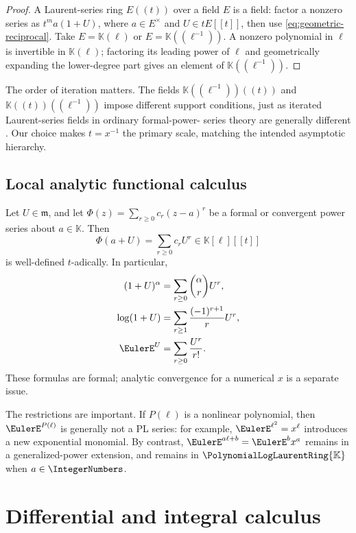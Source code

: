 \documentclass[11pt,oneside]{article}
\numberwithin{equation}{section}
\theoremstyle{definition}
\newcommand{\K}{\mathbb{K}}
\newcommand{\PL}{\PolynomialLogLaurentRing{\K}}
\begin{document}
\begin{proof}
A Laurent-series ring \(E((t))\) over a field \(E\) is a field: factor a nonzero
series as \(t^m a(1+U)\), where \(a\in E^\times\) and \(U\in tE[[t]]\), then use
\eqref{eq:geometric-reciprocal}.  Take \(E=\K(\ell)\) or
\(E=\K((\ell^{-1}))\).  A nonzero polynomial in \(\ell\) is invertible in
\(\K(\ell)\); factoring its leading power of \(\ell\) and geometrically expanding
the lower-degree part gives an element of \(\K((\ell^{-1}))\).
\end{proof}

The order of iteration matters.  The fields
\(\K((\ell^{-1}))((t))\) and \(\K((t))((\ell^{-1}))\) impose different support
conditions, just as iterated Laurent-series fields in ordinary formal-power-
series theory are generally different \cite{GesselLagrange}.  Our choice makes
\(t=x^{-1}\) the primary scale, matching the intended asymptotic hierarchy.

\subsection{Local analytic functional calculus}

Let \(U\in\mathfrak m\), and let
\(\Phi(z)=\sum_{r\ge0}c_r(z-a)^r\) be a formal or convergent power series about
\(a\in\K\).  Then
\begin{equation}\label{eq:local-functional-calculus}
  \Phi(a+U)=\sum_{r\ge0}c_rU^r\in\K[\ell][[t]]
\end{equation}
is well-defined \(t\)-adically.  In particular,
\begin{align}
 (1+U)^\alpha&=\sum_{r\ge0}\binom{\alpha}{r}U^r,\label{eq:binomial-U}\\
 \log(1+U)&=\sum_{r\ge1}\frac{(-1)^{r+1}}{r}U^r,\label{eq:log-U}\\
 \EulerE^U&=\sum_{r\ge0}\frac{U^r}{r!}.\label{eq:exp-U}
\end{align}
These formulas are formal; analytic convergence for a numerical \(x\) is a
separate issue.

The restrictions are important.  If \(P(\ell)\) is a nonlinear polynomial,
then \(\EulerE^{P(\ell)}\) is generally not a PL series: for example,
\(\EulerE^{\ell^2}=x^{\ell}\) introduces a new exponential monomial.  By contrast,
\(\EulerE^{a\ell+b}=\EulerE^b x^a\) remains in a generalized-power extension, and remains in
\(\PL\) when \(a\in\IntegerNumbers\).

\section{Differential and integral calculus}\label{sec:differential}
\end{document}
